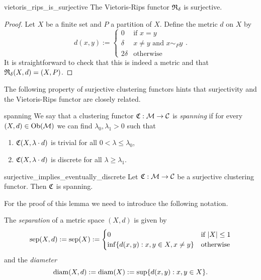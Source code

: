 \begin{proposition}{\cite[Rem.~6.1]{Carlsson2010}}{vietoris_rips_is_surjective}
    The Vietoris-Rips functor $\mathfrak{R}_\delta$ is surjective.
\end{proposition}
\begin{proof}
Let $X$ be a finite set and $P$ a partition of $X$. Define the metric $d$ on $X$ by
\begin{equation*}
    d(x,y) := \begin{cases}
        0 & \text{if } x = y\\
        \delta & x \neq y \text{ and } x \sim_P y\\
        2\delta & \text{otherwise}
    \end{cases}.
\end{equation*}
It is straightforward to check that this is indeed a metric and that $\mathfrak{R}_\delta(X,d) = (X,P)$.
\end{proof}

The following property of surjective clustering functors hints that surjectivity and the Vietoris-Rips functor are closely related.


\begin{definition}{}{spanning}
    We say that a clustering functor $\mathfrak{C}: \mathcal{M} \to \mathcal{C}$ is \emph{spanning} if for every ${(X,d) \in \mathrm {Ob}(\mathcal{M})}$ we can find $\lambda_0, \lambda_1 > 0$ such that
    \begin{enumerate}
        \item $\mathfrak{C}(X,\lambda \cdot d)$ is trivial for all $0 < \lambda \le \lambda_0$,
        \item $\mathfrak{C}(X,\lambda \cdot d)$ is discrete for all $\lambda \ge \lambda_1$.
    \end{enumerate}
\end{definition}

\begin{lemma}{}{surjective_implies_eventually_discrete}
    Let $\mathfrak{C}: \mathcal{M} \to \mathcal{C}$ be a surjective clustering functor. Then $\mathfrak{C}$ is spanning.
\end{lemma}

For the proof of this lemma we need to introduce the following notation.

\begin{definition}{}{}
    The \emph{separation} of a metric space $(X,d)$ is given by
    \begin{equation*}
    \mathrm{sep}(X,d) := \mathrm{sep}(X) := \begin{cases}
        0 & \text{if } |X| \le 1\\
        \inf\{d(x,y): x,y \in X, x \neq y\} & \text{otherwise}
    \end{cases}
    \end{equation*}
    and the \emph{diameter}
    \begin{equation*}
    \mathrm{diam}(X,d) := \mathrm{diam}(X) := \sup\{d(x,y): x,y \in X\}.
    \end{equation*}
\end{definition}

